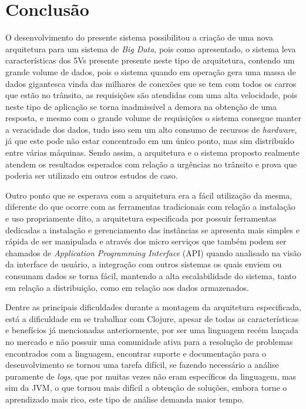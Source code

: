 \chapter{Conclusão}
\label{chap:conclusao}
O desenvolvimento do presente sistema possibilitou a criação de uma nova arquitetura para um sistema de \textit{Big Data}, pois como apresentado, o sistema leva características dos 5Vs presente presente neste tipo de arquitetura, contendo um grande volume de dados, pois o sistema quando em operação gera uma massa de dados gigantesca vinda das milhares de conexões que se tem com todos os carros que estão no trânsito, as requisições são atendidas com uma alta velocidade, pois neste tipo de aplicação se torna inadmissível a demora na obtenção de uma resposta, e mesmo com o grande volume de requisições o sistema consegue manter a veracidade dos dados, tudo isso sem um alto consumo de recursos de \textit{hardware}, já que este pode não estar concentrado em um único ponto, mas sim distribuído entre várias máquinas. Sendo assim, a arquitetura e o sistema proposto realmente atendem os resultados esperados com relação a urgências no trânsito e prova que poderia ser utilizado em outros estudos de caso.

Outro ponto que se esperava com a arquitetura era a fácil utilização da mesma, diferente do que ocorre com as ferramentas tradicionais com relação a instalação e uso propriamente dito, a arquitetura especificada por possuir ferramentas dedicadas a instalação e gerenciamento das instâncias se apresenta mais simples e rápida de ser manipulada e através dos micro serviços que também podem ser chamados de \textit{Application Programming Interface} (API) quando analisado na visão da interface de usuário, a integração com outros sistemas os quais enviem ou consumam dados se torna fácil, mantendo a alta escalabilidade do sistema, tanto em relação a distribuição, como em relação aos dados armazenados.

Dentre as principais dificuldades durante a montagem da arquitetura especificada, está a dificuldade em se trabalhar com Clojure, apesar de todas as características e benefícios já mencionadas anteriormente, por ser uma linguagem recém lançada no mercado e não possuir uma comunidade ativa para a resolução de problemas encontrados com a linguagem, encontrar suporte e documentação para o desenvolvimento se tornou uma tarefa difícil, se fazendo necessário a análise puramente de \textit{logs}, que por muitas vezes não eram específicos da linguagem, mas sim da JVM, o que tornou mais difícil a obtenção de soluções, embora torne o aprendizado mais rico, este tipo de análise demanda maior tempo.

